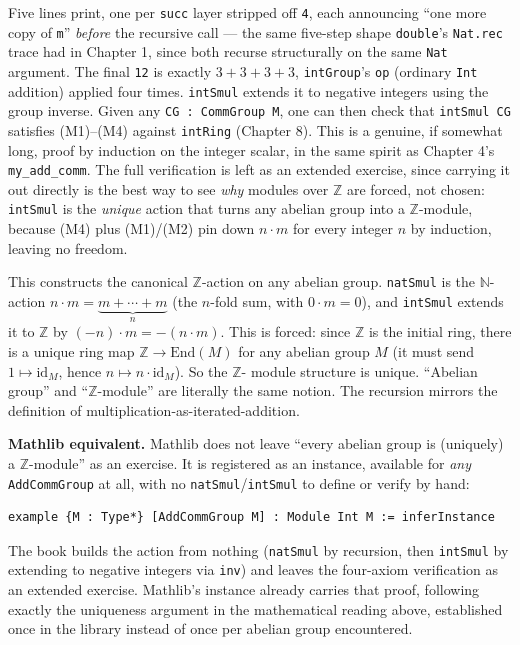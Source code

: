 Five lines print, one per \texttt{succ} layer stripped off \texttt{4}, each announcing ``one more copy of \texttt{m}'' \emph{before} the recursive call --- the same five-step shape \texttt{double}'s \texttt{Nat.rec} trace had in Chapter 1, since both recurse structurally on the same \texttt{Nat} argument. The final \texttt{12} is exactly \(3+3+3+3\), \texttt{intGroup}'s \texttt{op} (ordinary \texttt{Int} addition) applied four times. \texttt{intSmul} extends it to negative integers using the group inverse. Given any \texttt{CG : CommGroup M}, one can then check that \texttt{intSmul CG} satisfies (M1)--(M4) against \texttt{intRing} (Chapter 8). This is a genuine, if somewhat long, proof by induction on the integer scalar, in the same spirit as Chapter 4's \texttt{my\_\allowbreak{}add\_\allowbreak{}comm}. The full verification is left as an extended exercise, since carrying it out directly is the best way to see \emph{why} modules over \(\mathbb{Z}\) are forced, not chosen: \texttt{intSmul} is the \emph{unique} action that turns any abelian group into a \(\mathbb{Z}\)-module, because (M4) plus (M1)/(M2) pin down \(n \cdot m\) for every integer \(n\) by induction, leaving no freedom.

\begin{mathreading}

This constructs the canonical \(\mathbb{Z}\)-action on any abelian group. \texttt{natSmul} is the \(\mathbb{N}\)-action \(n\cdot m = \underbrace{m + \cdots + m}_{n}\) (the \(n\)-fold sum, with \(0\cdot m = 0\)), and \texttt{intSmul} extends it to \(\mathbb{Z}\) by \((-n)\cdot m = -(n\cdot m)\). This is forced: since \(\mathbb{Z}\) is the initial ring, there is a unique ring map \(\mathbb{Z} \to
\mathrm{End}(M)\) for any abelian group \(M\) (it must send \(1 \mapsto
\mathrm{id}_M\), hence \(n \mapsto n\cdot\mathrm{id}_M\)). So the \(\mathbb{Z}\)- module structure is unique. ``Abelian group'' and ``\(\mathbb{Z}\)-module'' are literally the same notion. The recursion mirrors the definition of multiplication-as-iterated-addition.

\end{mathreading}

\textbf{Mathlib equivalent.} Mathlib does not leave ``every abelian group is (uniquely) a \(\mathbb{Z}\)-module'' as an exercise. It is registered as an instance, available for \emph{any} \texttt{AddCommGroup} at all, with no \texttt{natSmul}/\texttt{intSmul} to define or verify by hand:

\begin{lstlisting}
example {M : Type*} [AddCommGroup M] : Module Int M := inferInstance
\end{lstlisting}

The book builds the action from nothing (\texttt{natSmul} by recursion, then \texttt{intSmul} by extending to negative integers via \texttt{inv}) and leaves the four-axiom verification as an extended exercise. Mathlib's instance already carries that proof, following exactly the uniqueness argument in the mathematical reading above, established once in the library instead of once per abelian group encountered.

